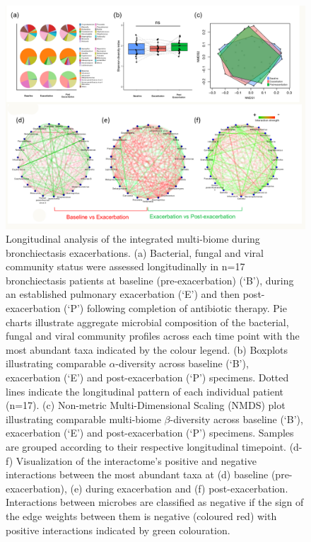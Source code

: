 \begin{figure}[!htb]
	\centering
	\includegraphics[width=\textwidth]{image/longitudinal.png}
	\caption{Longitudinal analysis of the integrated multi-biome during bronchiectasis exacerbations. (a) Bacterial, fungal and viral community status were assessed longitudinally in n=17 bronchiectasis patients at baseline (pre-exacerbation) (‘B’), during an established pulmonary exacerbation (‘E’) and then post-exacerbation (‘P’) following completion of antibiotic therapy. Pie charts illustrate aggregate microbial composition of the bacterial, fungal and viral community profiles across each time point with the most abundant taxa indicated by the colour legend. (b) Boxplots illustrating comparable $\alpha$-diversity across baseline (‘B’), exacerbation (‘E’) and post-exacerbation (‘P’) specimens. Dotted lines indicate the longitudinal pattern of each individual patient (n=17). (c) Non-metric Multi-Dimensional Scaling (NMDS) plot illustrating comparable multi-biome $\beta$-diversity across baseline (‘B’), exacerbation (‘E’) and post-exacerbation (‘P’) specimens. Samples are grouped according to their respective longitudinal timepoint. (d-f) Visualization of the interactome’s positive and negative interactions between the most abundant taxa at (d) baseline (pre-exacerbation), (e) during exacerbation and (f) post-exacerbation. Interactions between microbes are classified as negative if the sign of the edge weights between them is negative (coloured red) with positive interactions indicated by green colouration.}
	\label{fig4}
\end{figure}

